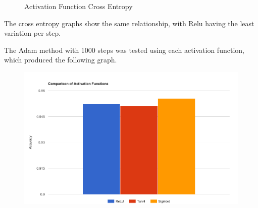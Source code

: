 \begin{figure}[H]%
    \centering
    \qquad
    \qquad
    \caption{Activation Function Cross Entropy}%
\end{figure}

The cross entropy graphs show the same relationship, with Relu having the least variation per step.

The Adam method with 1000 steps was tested using each activation function, which produced the following graph.

\begin{figure}[H]
	\centering
	\includegraphics[width=\linewidth]{images/q7_activation_comparison}
\end{figure}

